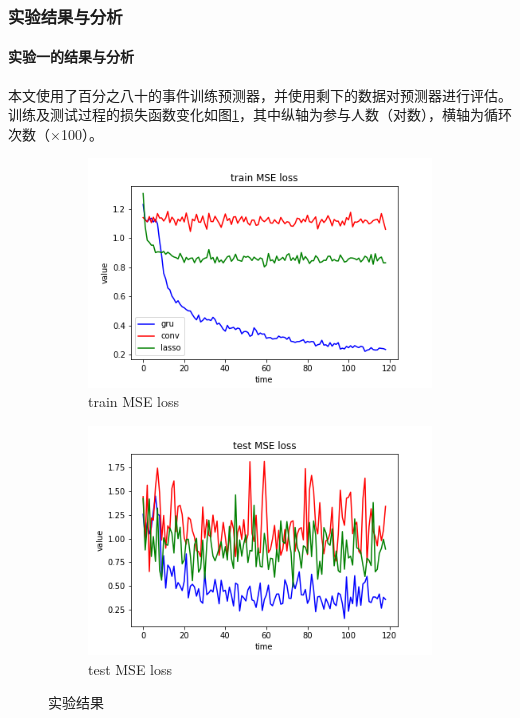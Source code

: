 \subsubsection{实验结果与分析}
\paragraph{实验一的结果与分析}
本文使用了百分之八十的事件训练预测器，并使用剩下的数据对预测器进行评估。训练及测试过程的损失函数变化如图\ref{f2-4}，其中纵轴为参与人数（对数），横轴为循环次数（×100）。
\begin{figure}[htb]
	\centering
	\begin{subfigure}{.49\textwidth}
		\includegraphics[width=\textwidth]{trainloss.png}
		\caption{train MSE loss}
	\end{subfigure}
	\begin{subfigure}{.49\textwidth}
		\includegraphics[width=\textwidth]{testloss.png}
		\caption{test MSE loss}
	\end{subfigure}
    \caption{实验结果}
    \label{f2-4}
\end{figure} 
